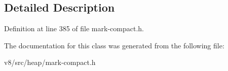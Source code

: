 \subsection{Detailed Description}


Definition at line 385 of file mark-\/compact.\+h.



The documentation for this class was generated from the following file\+:\begin{DoxyCompactItemize}
\item 
v8/src/heap/mark-\/compact.\+h\end{DoxyCompactItemize}
